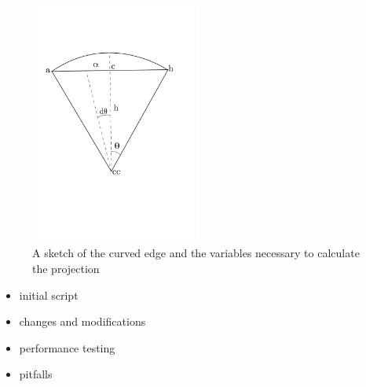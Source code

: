 \begin{figure}[h]
    \centering
    \includegraphics[width = 0.5\textwidth]{Figures/curvature.pdf}
    \caption{A sketch of the curved edge and the variables necessary to calculate the projection}
    \label{fig:curvature}
\end{figure}


\begin{itemize}
	\item initial script
	\item changes and modifications
	\item performance testing
	\item pitfalls
\end{itemize}


